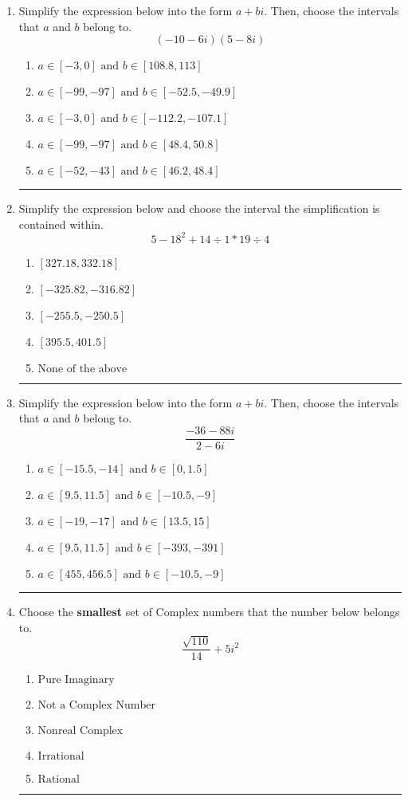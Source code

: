 \documentclass[14pt]{extbook}
\newcommand{\litem}[1]{\item#1\hspace*{-1cm}\rule{\textwidth}{0.4pt}}
\begin{document}
\begin{enumerate}
{\begin{enumerate}[label=\Alph*.]
\end{enumerate} }
\litem{
Simplify the expression below into the form $a+bi$. Then, choose the intervals that $a$ and $b$ belong to.\[ (-10 - 6 i)(5 - 8 i) \]\begin{enumerate}[label=\Alph*.]
\item \( a \in [-3, 0] \text{ and } b \in [108.8, 113] \)
\item \( a \in [-99, -97] \text{ and } b \in [-52.5, -49.9] \)
\item \( a \in [-3, 0] \text{ and } b \in [-112.2, -107.1] \)
\item \( a \in [-99, -97] \text{ and } b \in [48.4, 50.8] \)
\item \( a \in [-52, -43] \text{ and } b \in [46.2, 48.4] \)

\end{enumerate} }
\litem{
Simplify the expression below and choose the interval the simplification is contained within.\[ 5 - 18^2 + 14 \div 1 * 19 \div 4 \]\begin{enumerate}[label=\Alph*.]
\item \( [327.18, 332.18] \)
\item \( [-325.82, -316.82] \)
\item \( [-255.5, -250.5] \)
\item \( [395.5, 401.5] \)
\item \( \text{None of the above} \)

\end{enumerate} }
\litem{
Simplify the expression below into the form $a+bi$. Then, choose the intervals that $a$ and $b$ belong to.\[ \frac{-36 - 88 i}{2 - 6 i} \]\begin{enumerate}[label=\Alph*.]
\item \( a \in [-15.5, -14] \text{ and } b \in [0, 1.5] \)
\item \( a \in [9.5, 11.5] \text{ and } b \in [-10.5, -9] \)
\item \( a \in [-19, -17] \text{ and } b \in [13.5, 15] \)
\item \( a \in [9.5, 11.5] \text{ and } b \in [-393, -391] \)
\item \( a \in [455, 456.5] \text{ and } b \in [-10.5, -9] \)

\end{enumerate} }
\litem{
Choose the \textbf{smallest} set of Complex numbers that the number below belongs to.\[ \frac{\sqrt{110}}{14}+5i^2 \]\begin{enumerate}[label=\Alph*.]
\item \( \text{Pure Imaginary} \)
\item \( \text{Not a Complex Number} \)
\item \( \text{Nonreal Complex} \)
\item \( \text{Irrational} \)
\item \( \text{Rational} \)


\end{enumerate}}
\end{enumerate}
\end{document}
